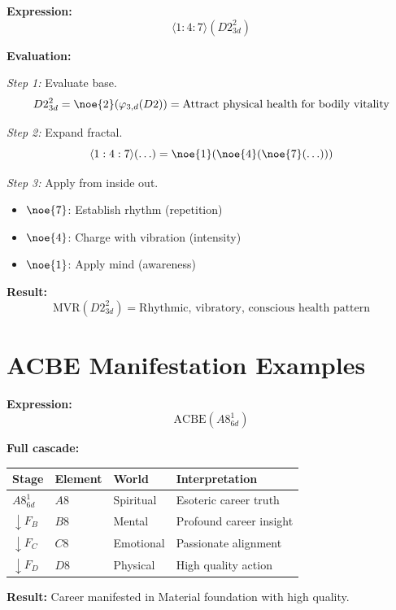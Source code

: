 \begin{example}
\label{ex:health}
\textbf{Expression:}
\[
\langle 1 : 4 : 7 \rangle(D2^2_{3d})
\]

\textbf{Evaluation:}

\textit{Step 1:} Evaluate base.
\[
D2^2_{3d} = \noe{2}(\varphi_{3,d}(D2)) = \text{Attract physical health for bodily vitality}
\]

\textit{Step 2:} Expand fractal.
\[
\langle 1 : 4 : 7 \rangle(\ldots) = \noe{1}(\noe{4}(\noe{7}(\ldots)))
\]

\textit{Step 3:} Apply from inside out.
\begin{itemize}
  \item $\noe{7}$: Establish rhythm (repetition)
  \item $\noe{4}$: Charge with vibration (intensity)
  \item $\noe{1}$: Apply mind (awareness)
\end{itemize}

\textbf{Result:}
\[
\mathrm{MVR}(D2^2_{3d}) = \text{Rhythmic, vibratory, conscious health pattern}
\]
\end{example}

\section{ACBE Manifestation Examples}

\begin{example}
\label{ex:career}
\textbf{Expression:}
\[
\mathrm{ACBE}(A8^1_{6d})
\]

\textbf{Full cascade:}
\begin{center}
\begin{tabular}{llll}
\toprule
\textbf{Stage} & \textbf{Element} & \textbf{World} & \textbf{Interpretation} \\
\midrule
$A8^1_{6d}$ & $A8$ & Spiritual & Esoteric career truth \\
$\downarrow F_B$ & $B8$ & Mental & Profound career insight \\
$\downarrow F_C$ & $C8$ & Emotional & Passionate alignment \\
$\downarrow F_D$ & $D8$ & Physical & High quality action \\
\bottomrule
\end{tabular}
\end{center}

\textbf{Result:} Career manifested in Material foundation with high quality.
\end{example}

